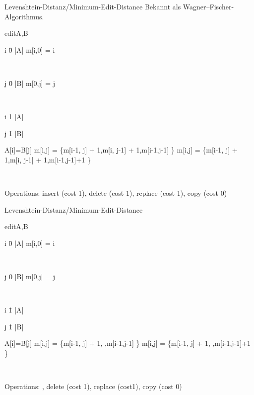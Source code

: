 \documentclass[aspectratio=169]{beamer}
\begin{document}
\begin{frame}{Levenshtein-Distanz/Minimum-Edit-Distance}
Bekannt als Wagner–Fischer-Algorithmus.
\begin{algorithm}{edit}{A,B}
\begin{FOR}
{i \= 0 \TO |A|}
m[i,0] = i
\end{FOR}\\
\begin{FOR}
{j \= 0 \TO |B|}
m[0,j] = j
\end{FOR}\\
\begin{FOR}
{i \= 1 \TO |A|}
\begin{FOR}
{j \= 1 \TO |B|}
\begin{IF}{A[i]=B[j]}
m[i,j] = \min\{m[i\mbox{-}1, j] \mbox{+} 1,m[i, j\mbox{-}1] \mbox{+} 1,m[i\mbox{-}1,j\mbox{-}1] \}
\ELSE
m[i,j] = \min\{m[i\mbox{-}1, j] \mbox{+} 1,m[i, j\mbox{-}1] \mbox{+} 1,m[i\mbox{-}1,j\mbox{-}1]\mbox{+}1 \}
\end{IF}
\end{FOR}
\end{FOR}\\
\end{algorithm}
Operations: insert (cost 1), delete (cost 1), replace (cost 1), copy (cost 0)
\end{frame}

\begin{frame}{Levenshtein-Distanz/Minimum-Edit-Distance}
\begin{algorithm}{edit}{A,B}
\begin{FOR}
{i \= 0 \TO |A|}
m[i,0] = i
\end{FOR}\\
\begin{FOR}
{j \= 0 \TO |B|}
m[0,j] = j
\end{FOR}\\
\begin{FOR}
{i \= 1 \TO |A|}
\begin{FOR}
{j \= 1 \TO |B|}
\begin{IF}{A[i]=B[j]}
m[i,j] = \min\{m[i\mbox{-}1, j] \mbox{+} 1, ,m[i\mbox{-}1,j\mbox{-}1] \}
\ELSE
m[i,j] = \min\{m[i\mbox{-}1, j] \mbox{+} 1, ,m[i\mbox{-}1,j\mbox{-}1]\mbox{+}1 \}
\end{IF}
\end{FOR}
\end{FOR}\\
\end{algorithm}
Operations: , delete (cost 1), replace (cost1), copy (cost 0)
\end{frame}
\end{document}
